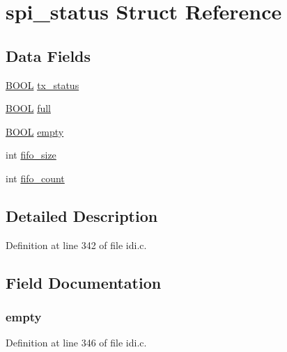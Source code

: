 \hypertarget{structspi__status}{\section{spi\+\_\+status Struct Reference}
\label{structspi__status}
}
\subsection*{Data Fields}
\begin{DoxyCompactItemize}
\item 
\hyperlink{idi_8c_a050c65e107f0c828f856a231f4b4e788}{B\+O\+O\+L} \hyperlink{structspi__status_a234b821e581a221369b67154e3e7cfa8}{tx\+\_\+status}
\item 
\hyperlink{idi_8c_a050c65e107f0c828f856a231f4b4e788}{B\+O\+O\+L} \hyperlink{structspi__status_a3b60b3c5cbe0736af58dccbde4e3161d}{full}
\item 
\hyperlink{idi_8c_a050c65e107f0c828f856a231f4b4e788}{B\+O\+O\+L} \hyperlink{structspi__status_a68f61f8d0fb7e552cf463bb4926b5f1d}{empty}
\item 
int \hyperlink{structspi__status_a771649fbbbbf3161bbddd4d49db51552}{fifo\+\_\+size}
\item 
int \hyperlink{structspi__status_a1515bdf17aa69c23285df7f9637ca30e}{fifo\+\_\+count}
\end{DoxyCompactItemize}


\subsection{Detailed Description}


Definition at line 342 of file idi.\+c.



\subsection{Field Documentation}
\hypertarget{structspi__status_a68f61f8d0fb7e552cf463bb4926b5f1d}{
\subsubsection[{empty}]{ empty}}\label{structspi__status_a68f61f8d0fb7e552cf463bb4926b5f1d}


Definition at line 346 of file idi.\+c.



